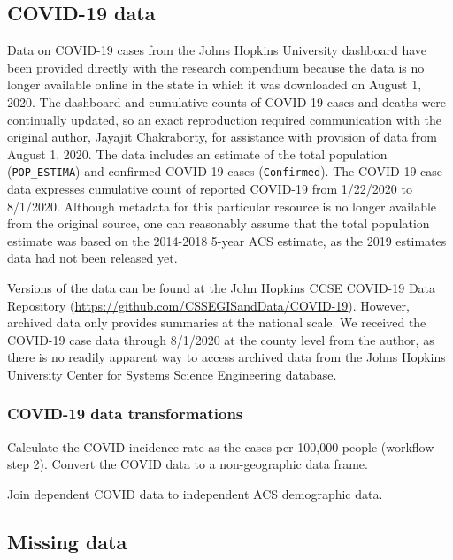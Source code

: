 \documentclass[
]{article}
\begin{document}
\hypertarget{covid-19-data}{%
\subsection{COVID-19 data}\label{covid-19-data}}

Data on COVID-19 cases from the Johns Hopkins University dashboard have
been provided directly with the research compendium because the data is
no longer available online in the state in which it was downloaded on
August 1, 2020. The dashboard and cumulative counts of COVID-19 cases
and deaths were continually updated, so an exact reproduction required
communication with the original author, Jayajit Chakraborty, for
assistance with provision of data from August 1, 2020. The data includes
an estimate of the total population (\texttt{POP\_ESTIMA}) and confirmed
COVID-19 cases (\texttt{Confirmed}). The COVID-19 case data expresses
cumulative count of reported COVID-19 from 1/22/2020 to 8/1/2020.
Although metadata for this particular resource is no longer available
from the original source, one can reasonably assume that the total
population estimate was based on the 2014-2018 5-year ACS estimate, as
the 2019 estimates data had not been released yet.

Versions of the data can be found at the John Hopkins CCSE COVID-19 Data
Repository (\url{https://github.com/CSSEGISandData/COVID-19}). However,
archived data only provides summaries at the national scale. We received
the COVID-19 case data through 8/1/2020 at the county level from the
author, as there is no readily apparent way to access archived data from
the Johns Hopkins University Center for Systems Science Engineering
database.

\hypertarget{covid-19-data-transformations}{%
\subsubsection{COVID-19 data
transformations}\label{covid-19-data-transformations}}

Calculate the COVID incidence rate as the cases per 100,000 people
(workflow step 2). Convert the COVID data to a non-geographic data
frame.

Join dependent COVID data to independent ACS demographic data.

\hypertarget{missing-data}{%
\subsection{Missing data}\label{missing-data}}
\end{document}
